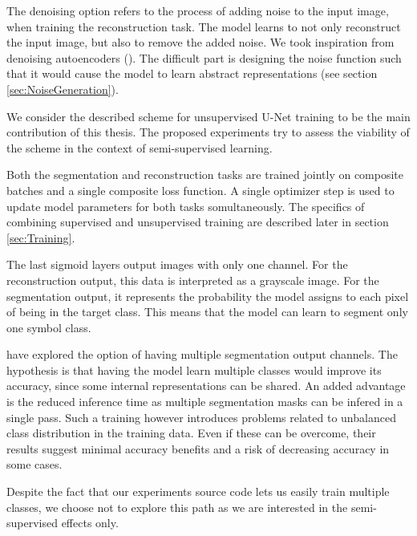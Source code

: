 The denoising option refers to the process of adding noise to the input image, when training the reconstruction task. The model learns to not only reconstruct the input image, but also to remove the added noise. We took inspiration from denoising autoencoders (\cite{StackedDenoisingAutoencoders}). The difficult part is designing the noise function such that it would cause the model to learn abstract representations (see section \ref{sec:NoiseGeneration}).

We consider the described scheme for unsupervised U-Net training to be the main contribution of this thesis. The proposed experiments try to assess the viability of the scheme in the context of semi-supervised learning.

Both the segmentation and reconstruction tasks are trained jointly on composite batches and a single composite loss function. A single optimizer step is used to update model parameters for both tasks somultaneously. The specifics of combining supervised and unsupervised training are described later in section \ref{sec:Training}.

The last sigmoid layers output images with only one channel. For the reconstruction output, this data is interpreted as a grayscale image. For the segmentation output, it represents the probability the model assigns to each pixel of being in the target class. This means that the model can learn to segment only one symbol class.

\cite{HajicEtAl} have explored the option of having multiple segmentation output channels. The hypothesis is that having the model learn multiple classes would improve its accuracy, since some internal representations can be shared. An added advantage is the reduced inference time as multiple segmentation masks can be infered in a single pass. Such a training however introduces problems related to unbalanced class distribution in the training data. Even if these can be overcome, their results suggest minimal accuracy benefits and a risk of decreasing accuracy in some cases.

Despite the fact that our experiments source code lets us easily train multiple classes, we choose not to explore this path as we are interested in the semi-supervised effects only.

